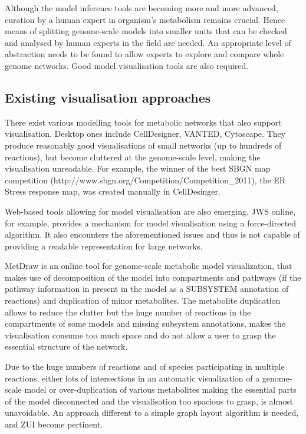 \documentclass{bmcart}
\begin{document}
Although the model inference tools are becoming more and more advanced, curation by a human expert in organism's metabolism remains crucial. Hence means of splitting genome-scale models into smaller units that can be checked and analysed by human experts in the field are needed. An appropriate level of abstraction needs to be found to allow experts to explore and compare whole genome networks. Good model visualisation tools are also required.

\subsection*{Existing visualisation approaches}
There exist various modelling tools for metabolic networks that also support visualisation. Desktop ones include CellDesigner\cite{Funahashi2008}, VANTED\cite{Rohn2012}, Cytoscape\cite{Smoot2011}. They produce reasonably good visualisations of small networks (up to hundreds of reactions), but become cluttered at the genome-scale level, making the visualisation unreadable. For example, the winner of the best SBGN map competition (http://www.sbgn.org/Competition/Competition\_2011), the ER Stress response\cite{Groenendyk2010} map,  was created manually in CellDesinger.

Web-based tools allowing for model visualisation are also emerging.  JWS online\cite{Snoep2003}, for example, provides a mechanism for model visualisation using a force-directed algorithm. It also encounters the aforementioned issues and thus is not capable of providing a readable representation for large networks.  

MetDraw\cite{Jensen2014} is an online tool for genome-scale metabolic model visualization, that makes use of decomposition of the model into compartments and pathways (if the pathway information in present in the model as a SUBSYSTEM annotation of reactions) and duplication of minor metabolites. The metabolite duplication allows to reduce the clutter but the huge number of reactions in the compartments of some models and missing subsystem annotations, makes the visualisation consume too much space and do not allow a user to grasp the essential structure of the network.

Due to the huge numbers of reactions and of species participating in multiple reactions, either lots of intersections in an automatic visualization of a genome-scale model or over-duplication of various metabolites making the essential parts of the model disconnected and the visualisation too spacious to grasp, is almost unavoidable. An approach different to a simple graph layout algorithm is needed, and ZUI become pertinent.
\end{document}
